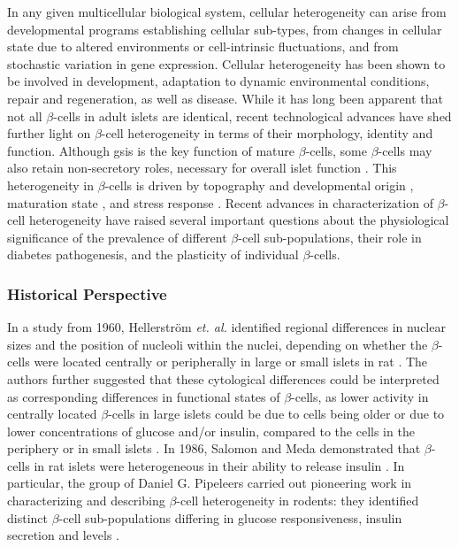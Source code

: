 In any given multicellular biological system, cellular heterogeneity  can arise from developmental programs establishing cellular sub-types, from changes in cellular state due to altered environments or cell-intrinsic fluctuations, and from stochastic variation in gene expression. Cellular heterogeneity has been shown to be involved in development, adaptation to dynamic environmental conditions, repair and regeneration, as well as disease.
While it has long been apparent that not all $\beta$-cells in adult islets are identical, recent technological advances have shed further light on $\beta$-cell heterogeneity in terms of their morphology, identity and function. Although \gls{gsis} is the key function of mature $\beta$-cells, some $\beta$-cells may also retain non-secretory roles, necessary for overall islet function \textbf{\cite{liu_all_2017}}. This heterogeneity in $\beta$-cells is driven by topography and developmental origin \textbf{\cite{puri_plasticity_2015,roscioni_impact_2016}}, maturation state \textbf{\cite{salinno_-cell_2019}}, and stress response \textbf{\cite{xin_pseudotime_2018}}. Recent advances in characterization of $\beta$-cell heterogeneity have raised several important questions about the physiological significance of the prevalence of different $\beta$-cell sub-populations, their role in diabetes pathogenesis, and the plasticity of individual $\beta$-cells.

\subsubsection{Historical Perspective}
In a study from 1960, Hellerström \textit{et. al.} identified regional differences in nuclear sizes and the position of nucleoli within the nuclei, depending on whether the $\beta$-cells were located centrally or peripherally in large or small islets in rat \textbf{\cite{hellerstrom_properties_1960}}. The authors further suggested that these cytological differences could be interpreted as corresponding differences in functional states of $\beta$-cells, as lower activity in centrally located $\beta$-cells in large islets could be due to cells being older or due to lower concentrations of glucose and/or insulin, compared to the cells in the periphery or in small islets \textbf{\cite{hellerstrom_properties_1960}}. In 1986, Salomon and Meda demonstrated that $\beta$-cells in rat islets were heterogeneous in their ability to release insulin \textbf{\cite{salomon_heterogeneity_1986}}. In particular, the group of Daniel G. Pipeleers carried out pioneering work in characterizing and describing $\beta$-cell heterogeneity in rodents: they identified distinct $\beta$-cell sub-populations differing in glucose responsiveness, insulin secretion and  levels \textbf{\cite{kiekens_differences_1992,schuit_glucose_1988,van_de_winkel_autofluorescence-activated_1983}}.\\

